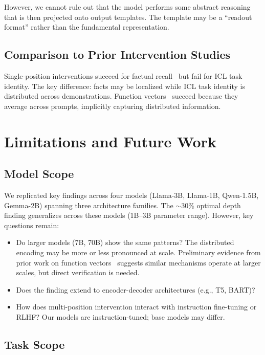 \documentclass[sigconf,anonymous]{acmart}
\begin{document}
However, we cannot rule out that the model performs some abstract reasoning that is then projected onto output templates. The template may be a ``readout format'' rather than the fundamental representation.

\subsection{Comparison to Prior Intervention Studies}

Single-position interventions succeed for factual recall~\cite{meng2022locating} but fail for ICL task identity. The key difference: facts may be localized while ICL task identity is distributed across demonstrations. Function vectors~\cite{todd2023function} succeed because they average across prompts, implicitly capturing distributed information.

\section{Limitations and Future Work}
\label{app:limitations}

\subsection{Model Scope}

We replicated key findings across four models (Llama-3B, Llama-1B, Qwen-1.5B, Gemma-2B) spanning three architecture families. The $\sim$30\% optimal depth finding generalizes across these models (1B--3B parameter range). However, key questions remain:
\begin{itemize}
    \item Do larger models (7B, 70B) show the same patterns? The distributed encoding may be more or less pronounced at scale. Preliminary evidence from prior work on function vectors~\cite{todd2023function} suggests similar mechanisms operate at larger scales, but direct verification is needed.
    \item Does the finding extend to encoder-decoder architectures (e.g., T5, BART)?
    \item How does multi-position intervention interact with instruction fine-tuning or RLHF? Our models are instruction-tuned; base models may differ.
\end{itemize}

\subsection{Task Scope}
\end{document}
